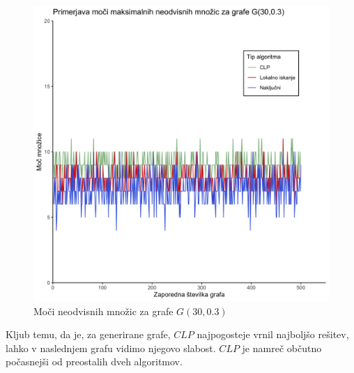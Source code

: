 \documentclass[a4paper, 12pt]{article}
\begin{document}
\begin{figure}[h!]
	\begin{center}
		\includegraphics[scale=0.11]{R_koda/pon-moc.png}
		\caption{Moči neodvisnih množic za grafe $G(30,0.3)$}
	\end{center}
\end{figure}

\noindent Kljub temu, da je, za generirane grafe, $CLP$ najpogosteje vrnil najboljšo rešitev, lahko v naslednjem grafu vidimo njegovo slabost. $CLP$ je namreč občutno počasnejši od preostalih dveh algoritmov. 
\end{document}

